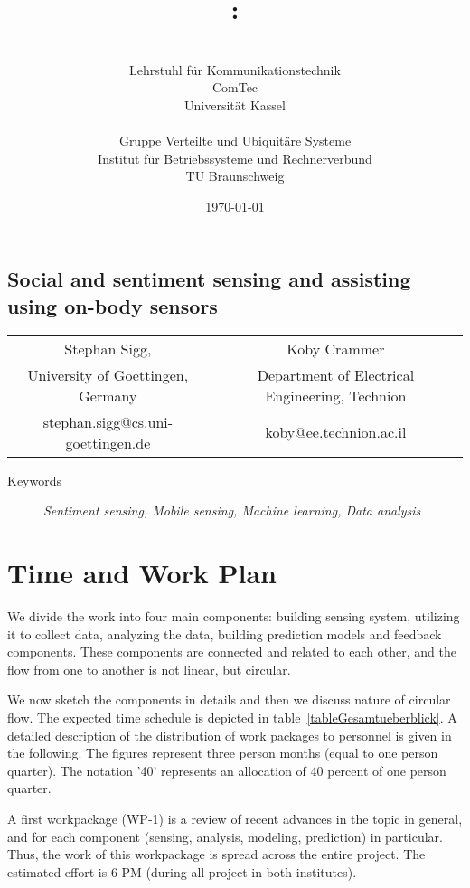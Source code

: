 \documentclass[12pt]{article}
\author{\begin{minipage}[t]{7.1cm}\centering \small \VornameAntragstellerA\ \NachnameAntragstellerA\\ \small Lehrstuhl für Kommunikationstechnik\\ \small ComTec\\ \small Universität Kassel\end{minipage}
\begin{minipage}[t]{7.1cm}\centering \small \VornameAntragstellerB\ \NachnameAntragstellerB\\ \small Gruppe Verteilte und Ubiquitäre Systeme \\ \small Institut für Betriebssysteme und Rechnerverbund\\ \small TU Braunschweig\end{minipage}}
\title{\projektname:\\\notiz{Social and sentiment sensing and assisting using on-body sensors}}
\date{\small \today}
\begin{document}
\onehalfspacing %
\setcounter{secnumdepth}{5}
\pagebreak
\begin{center}
\section*{Social and sentiment sensing and assisting using on-body sensors}
\begin{tabular}{cc}
  Stephan Sigg, & Koby Crammer\\
  University of Goettingen, Germany & Department of Electrical Engineering, Technion \\
 stephan.sigg@cs.uni-goettingen.de & koby@ee.technion.ac.il
\end{tabular}

\end{center}
\begin{description}
	\item[Keywords] \textit{Sentiment sensing, Mobile sensing, Machine learning, Data analysis}
\end{description}

\section*{Time and Work Plan}
We divide the work into four main components: building sensing system, utilizing it to collect data, analyzing the data, building prediction models and feedback components. 
These components are connected and related to each other, and the flow from one to another is not linear, but circular.

We now sketch the components in details and then we discuss nature of circular flow. The expected time schedule is depicted in table~\ref{tableGesamtueberblick}. 
A detailed description of the distribution of work packages to personnel is given in the following.
The figures represent three person months (equal to one person quarter).
The notation '40' represents an allocation of 40 percent of one person quarter. 

A first workpackage (WP-1) is a review of recent advances in the topic in general, and for each component (sensing, analysis, modeling, prediction) in particular. Thus, the work of this workpackage is spread across the entire project. The estimated effort is 6 PM (during all project in both institutes).
\end{document}
